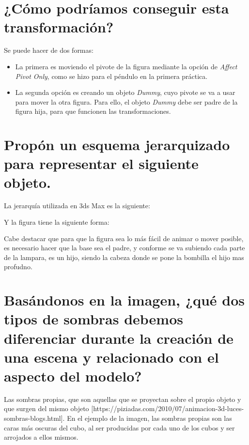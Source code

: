 \documentclass{article}
\begin{document}

\section{¿Cómo podríamos conseguir esta transformación?}


Se puede hacer de dos formas:

\begin{itemize}
    \item La primera es moviendo el pivote de la figura mediante la opción de \textit{Affect Pivot Only}, como se hizo para el péndulo en la primera práctica.
    
    
    \item La segunda opción es creando un objeto \textit{Dummy}, cuyo pivote se va a usar para mover la otra figura. Para ello, el objeto \textit{Dummy} debe ser padre de la figura hija, para que funcionen las transformaciones.
\end{itemize}

\section{Propón un esquema jerarquizado para representar el siguiente objeto.}


La jerarquía utilizada en 3ds Max es la siguiente:


Y la figura tiene la siguiente forma:


Cabe destacar que para que la figura sea lo más fácil de animar o mover posible, es necesario hacer que la base sea el padre, y conforme se va subiendo cada parte de la lampara, es un hijo, siendo la cabeza donde se pone la bombilla el hijo mas profudno.

\section{Basándonos en la imagen, ¿qué dos tipos de sombras debemos diferenciar durante la creación de una escena y relacionado con el aspecto del modelo?}


Las sombras propias, que son aquellas que se proyectan sobre el propio objeto y que surgen del mismo objeto [https://piziadas.com/2010/07/animacion-3d-luces-sombras-blogs.html]. En el ejemplo de la imagen, las sombras propias son las caras más oscuras del cubo, al ser producidas por cada uno de los cubos y ser arrojados a ellos mismos.
\end{document}
